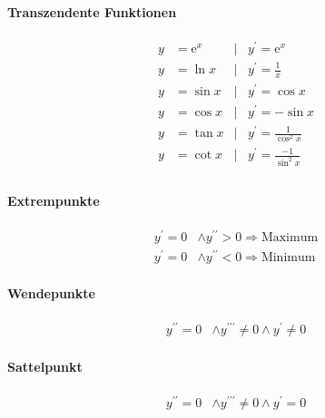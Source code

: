 \paragraph{Transzendente Funktionen}
\begin{align*}
   y &= \mathrm{e}^x    &| &y^{\prime} = \mathrm{e}^x \\
   y &= \ln{x}          &| &y^{\prime} = \frac{1}{x} \\
   y &= \sin{x}         &| &y^{\prime} = \cos{x} \\
   y &= \cos{x}         &| &y^{\prime} = - \sin{x} \\
   y &= \tan{x}         &| &y^{\prime} = \frac{1}{\cos^2{x}} \\
   y &= \cot{x}         &| &y^{\prime} = \frac{-1}{\sin^2{x}} \\
\end{align*}

\paragraph{Extrempunkte}
\begin{align*}
    y^{\prime}=0 &\land y^{\prime\prime} > 0  \Rightarrow  \textrm{Maximum} \\
    y^{\prime}=0 &\land y^{\prime\prime} < 0  \Rightarrow  \textrm{Minimum}
\end{align*}


\paragraph{Wendepunkte}
\begin{align*}
    y^{\prime\prime}=0 &\land y^{\prime\prime\prime} \ne 0 \land y^{\prime} \ne 0
\end{align*}
\paragraph{Sattelpunkt}
\begin{align*}
    y^{\prime\prime}=0 &\land y^{\prime\prime\prime} \ne 0 \land y^{\prime} = 0
\end{align*}




